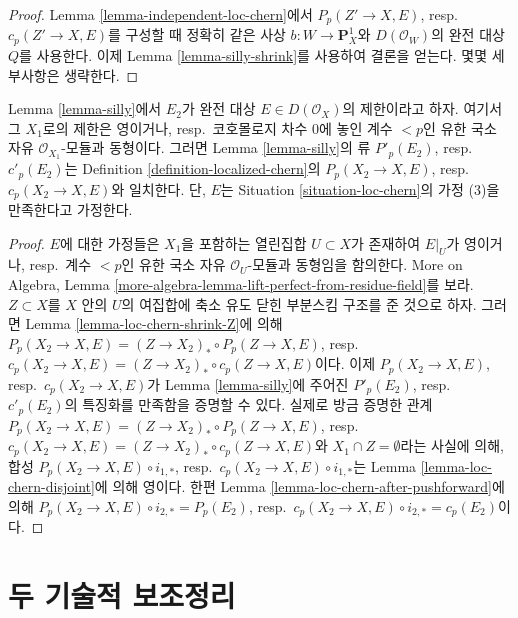 \begin{proof}
Lemma \ref{lemma-independent-loc-chern}에서 $P_p(Z' \to X, E)$,
resp.\ $c_p(Z' \to X, E)$를 구성할 때 정확히 같은 사상
$b : W \to \mathbf{P}^1_X$와 $D(\mathcal{O}_W)$의 완전 대상 $Q$를
사용한다. 이제 Lemma \ref{lemma-silly-shrink}를 사용하여 결론을 얻는다.
몇몇 세부사항은 생략한다.
\end{proof}

\begin{lemma}
\label{lemma-loc-chern-agree}
Lemma \ref{lemma-silly}에서 $E_2$가 완전 대상
$E \in D(\mathcal{O}_X)$의 제한이라고 하자. 여기서 그 $X_1$로의
제한은 영이거나, resp.\ 코호몰로지 차수 $0$에 놓인 계수 $< p$인 유한
국소 자유 $\mathcal{O}_{X_1}$-모듈과 동형이다. 그러면 Lemma
\ref{lemma-silly}의 류 $P'_p(E_2)$, resp.\ $c'_p(E_2)$는 Definition
\ref{definition-localized-chern}의 $P_p(X_2 \to X, E)$,
resp.\ $c_p(X_2 \to X, E)$와 일치한다. 단, $E$는 Situation
\ref{situation-loc-chern}의 가정 (3)을 만족한다고 가정한다.
\end{lemma}

\begin{proof}
$E$에 대한 가정들은 $X_1$을 포함하는 열린집합 $U \subset X$가
존재하여 $E|_U$가 영이거나, resp.\ 계수 $< p$인 유한 국소 자유
$\mathcal{O}_U$-모듈과 동형임을 함의한다. More on Algebra, Lemma
\ref{more-algebra-lemma-lift-perfect-from-residue-field}를 보라.
$Z \subset X$를 $X$ 안의 $U$의 여집합에 축소 유도 닫힌 부분스킴
구조를 준 것으로 하자. 그러면 Lemma \ref{lemma-loc-chern-shrink-Z}에
의해
$P_p(X_2 \to X, E) = (Z \to X_2)_* \circ P_p(Z \to X, E)$,
resp.\ $c_p(X_2 \to X, E) = (Z \to X_2)_* \circ c_p(Z \to X, E)$이다.
이제 $P_p(X_2 \to X, E)$, resp.\ $c_p(X_2 \to X, E)$가 Lemma
\ref{lemma-silly}에 주어진 $P'_p(E_2)$, resp.\ $c'_p(E_2)$의 특징화를
만족함을 증명할 수 있다. 실제로 방금 증명한 관계
$P_p(X_2 \to X, E) = (Z \to X_2)_* \circ P_p(Z \to X, E)$,
resp.\ $c_p(X_2 \to X, E) = (Z \to X_2)_* \circ c_p(Z \to X, E)$와
$X_1 \cap Z = \emptyset$라는 사실에 의해, 합성
$P_p(X_2 \to X, E) \circ i_{1, *}$,
resp.\ $c_p(X_2 \to X, E) \circ i_{1, *}$는 Lemma
\ref{lemma-loc-chern-disjoint}에 의해 영이다. 한편 Lemma
\ref{lemma-loc-chern-after-pushforward}에 의해
$P_p(X_2 \to X, E) \circ i_{2, *} = P_p(E_2)$,
resp.\ $c_p(X_2 \to X, E) \circ i_{2, *} = c_p(E_2)$이다.
\end{proof}





\section{두 기술적 보조정리}
\label{section-tools-loc-chern}

